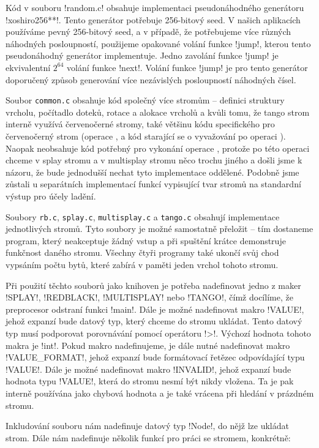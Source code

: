 Kód v souboru !random.c! obsahuje implementaci pseudonáhodného generátoru
!xoshiro256**!. Tento generátor potřebuje 256-bitový seed. V našich aplikacích
používáme pevný 256-bitový seed, a v případě, že potřebujeme více různých
náhodných posloupností, použijeme opakované volání funkce !jump!, kterou tento
pseudonáhodný generátor implementuje. Jedno zavolání funkce !jump! je
ekvivalentní $2^{64}$ volání funkce !next!. Volání funkce !jump! je pro tento
generátor doporučený způsob generování více nezávislých posloupností náhodných
čísel.

Soubor {\tt common.c} obsahuje kód společný více
stromům -- definici struktury vrcholu, počítadlo doteků, rotace a alokace vrcholů a kvůli
tomu, že tango strom interně využívá červenočerné stromy, také většinu kódu
specifického pro červenočerný strom (operace ,  a kód
starající se o vyvažování po operaci ). Naopak neobsahuje kód
potřebný pro vykonání operace , protože po této operaci chceme v
splay stromu a v multisplay stromu něco trochu jiného a došli jsme k názoru, že
bude jednodušší nechat tyto implementace oddělené. Podobně jsme zůstali u
separátních implementací funkcí vypisující tvar stromů na standardní výstup pro
účely ladění.

Soubory {\tt rb.c}, {\tt splay.c}, {\tt multisplay.c} a {\tt tango.c} obsahují
implementace jednotlivých stromů. Tyto soubory je možné samostatně přeložit --
tím dostaneme program, který neakceptuje žádný vstup a při spuštění krátce
demonstruje funkčnost daného stromu. Všechny čtyři programy také ukončí svůj
chod vypsáním počtu bytů, které zabírá v paměti jeden vrchol tohoto stromu.

Při použití těchto souborů jako knihoven je potřeba nadefinovat jedno z maker
!SPLAY!, !REDBLACK!, !MULTISPLAY! nebo !TANGO!, čímž docílíme, že preprocesor
odstraní funkci !main!. Dále je možné nadefinovat makro !VALUE!, jehož expanzí
bude datový typ, který chceme do stromu ukládat. Tento datový typ musí
podporovat porovnávání pomocí operátoru !>!. Výchozí hodnota tohoto makra je
!int!. Pokud makro nadefinujeme, je dále nutné nadefinovat makro
!VALUE_FORMAT!, jehož expanzí bude formátovací řetězec odpovídající typu
!VALUE!. Dále je možné nadefinovat makro !INVALID!, jehož expanzí bude hodnota
typu !VALUE!, která do stromu nesmí být nikdy vložena. Ta je pak interně
používána jako chybová hodnota a je také vrácena při hledání v prázdném stromu.

Inkludování souboru nám nadefinuje datový typ !Node!, do nějž lze ukládat strom. Dále nám nadefinuje několik funkcí pro práci se stromem, konkrétně:


